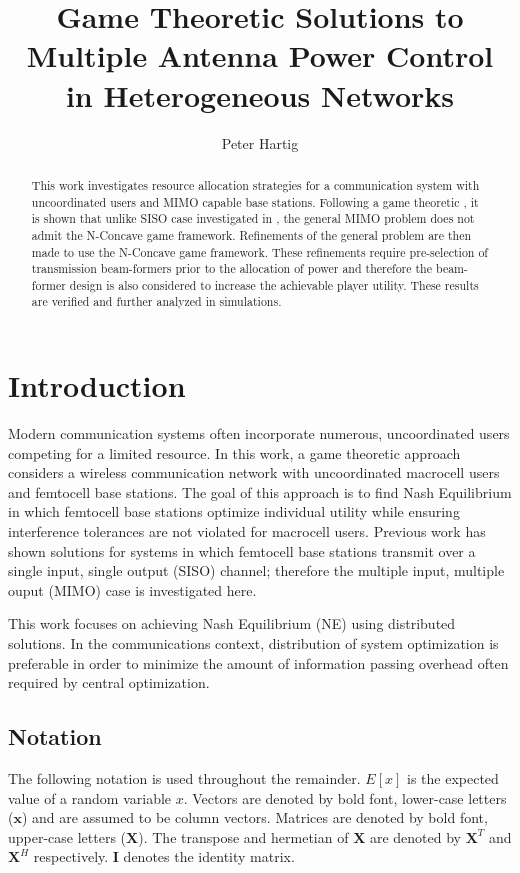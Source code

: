 \documentclass[12pt,a4paper]{report}
\title{Game Theoretic Solutions to Multiple Antenna Power Control in Heterogeneous Networks}
\author{Peter Hartig}
\begin{document}
\maketitle
\begin{abstract}
This work investigates resource allocation strategies for a communication system with uncoordinated users and MIMO capable base stations. Following a game theoretic , it is shown that unlike SISO case investigated in \cite{ghosh2015normalized}, the general MIMO problem does not admit the N-Concave game framework. Refinements of the general problem are then made to use the N-Concave game framework. These refinements require pre-selection of transmission beam-formers prior to the allocation of power and therefore the beam-former design is also considered to increase the achievable player utility. These results are verified and further analyzed in simulations.
\end{abstract}
%
\tableofcontents


\chapter{Introduction}
Modern communication systems often incorporate numerous, uncoordinated users competing for a limited resource. In this work, a game theoretic approach considers a wireless communication network with uncoordinated macrocell users and femtocell base stations. The goal of this approach is to find Nash Equilibrium in which femtocell base stations optimize individual utility while ensuring interference tolerances are not violated for macrocell users. 
Previous work has shown solutions for systems in which femtocell base stations transmit over a single input, single output (SISO) channel; therefore the multiple input, multiple ouput (MIMO) case is investigated here. 
\par
This work focuses on achieving Nash Equilibrium (NE) using distributed solutions. In the communications context, distribution of system optimization is preferable in order to minimize the amount of information passing overhead often required by central optimization. 


\section{Notation}
The following notation is used throughout the remainder. 
$E[x]$ is the expected value of a random variable $x$.
Vectors are denoted by bold font, lower-case letters ($\mathbf{x}$) and are assumed to be column vectors.
Matrices are denoted by bold font, upper-case letters ($\mathbf{X}$). The transpose and hermetian of $\mathbf{X}$ are denoted by $\mathbf{X}^T$ and $\mathbf{X}^H$ respectively.
$\mathbf{I}$ denotes the identity matrix.
\end{document}
